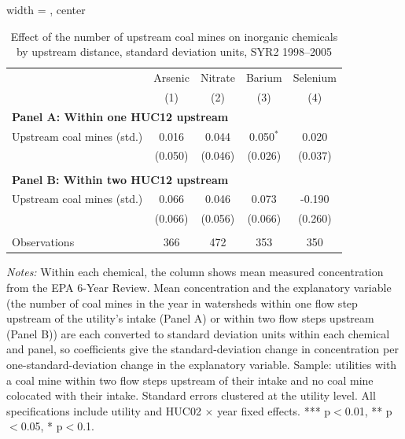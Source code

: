 \begin{table}[htbp]
   
   \caption{\label{tab:6yr_huc02fe_inorg_ravalli_2005_k2_sd_mines} Effect of the number of upstream coal mines on inorganic chemicals by upstream distance, standard deviation units, SYR2 1998--2005}
   \bigskip
   
   \centering
   
\begin{adjustbox}{width = \textwidth, center}
   \begin{tabular}{lcccc}
      \toprule
       & Arsenic & Nitrate & Barium & Selenium \\
                                 & (1)     & (2)     & (3)         & (4)\\  
      \midrule 
      \multicolumn{5}{l}{\textbf{Panel A: Within one HUC12 upstream}} \\
      Upstream coal mines (std.) & 0.016   & 0.044   & 0.050$^{*}$ & 0.020\\   
                                 & (0.050) & (0.046) & (0.026)     & (0.037)\\   
       \\
      \midrule 
      \multicolumn{5}{l}{\textbf{Panel B: Within two HUC12 upstream}} \\
      Upstream coal mines (std.) & 0.066   & 0.046   & 0.073   & -0.190\\   
                                 & (0.066) & (0.056) & (0.066) & (0.260)\\   
       \\
      Observations               & 366     & 472     & 353     & 350\\  
      \bottomrule
   \end{tabular}
\end{adjustbox}
   
   {\tiny\linespread{1}\selectfont \par \raggedright 
   \textit{Notes:} Within each chemical, the column shows mean measured concentration from the EPA 6-Year Review. Mean concentration and the explanatory variable (the number of coal mines in the year in watersheds within one flow step upstream of the utility's intake (Panel A) or within two flow steps upstream (Panel B)) are each converted to standard deviation units within each chemical and panel, so coefficients give the standard-deviation change in concentration per one-standard-deviation change in the explanatory variable. Sample: utilities with a coal mine within two flow steps upstream of their intake and no coal mine colocated with their intake. Standard errors clustered at the utility level. All specifications include utility and HUC02 $\times$ year fixed effects. *** p$<$0.01, ** p$<$0.05, * p$<$0.1.}
   
\end{table}


